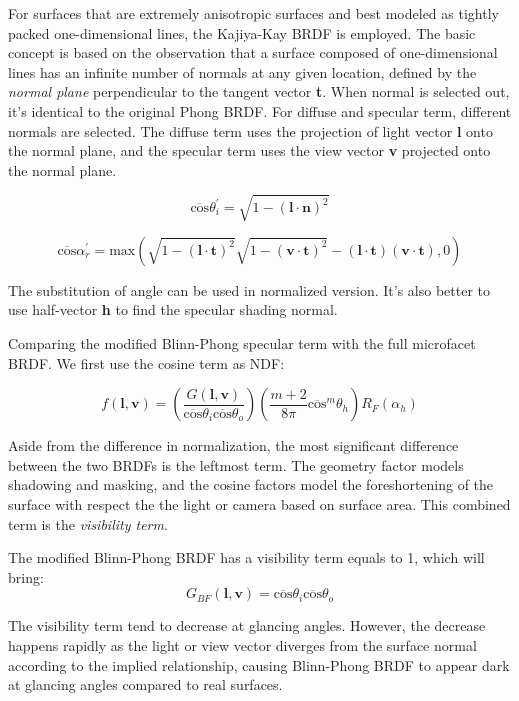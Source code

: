 \documentclass[10pt, a4paper]{article}
\begin{document}
        For surfaces that are extremely anisotropic surfaces and best modeled as tightly packed one-dimensional lines, the Kajiya-Kay BRDF is employed. The basic concept is based on the observation that a surface composed of one-dimensional lines has an infinite number of normals at any given location, defined by the \emph{normal plane} perpendicular to the tangent vector \textbf{t}. When normal is selected out, it's identical to the original Phong BRDF. For diffuse and specular term, different normals are selected. The diffuse term uses the projection of light vector \textbf{l} onto the normal plane, and the specular term uses the view vector \textbf{v} projected onto the normal plane. 

        $$\overline{\text{cos}}\theta_i^{'} = \sqrt{1 - (\textbf{l}\cdot\textbf{n})^2}$$

        $$\overline{\text{cos}}\alpha_r^{'} = \text{max}(\sqrt{1 - (\textbf{l}\cdot\textbf{t})^2}\sqrt{1 - (\textbf{v}\cdot\textbf{t})^2} - (\textbf{l}\cdot\textbf{t})(\textbf{v}\cdot\textbf{t}), 0)$$

        The substitution of angle can be used in normalized version. It's also better to use half-vector \textbf{h} to find the specular shading normal. 

        
        \bigskip 
        \bigskip


        Comparing the modified Blinn-Phong specular term with the full microfacet BRDF. We first use the cosine term as NDF:

        $$f(\textbf{l}, \textbf{v}) = (\frac{G(\textbf{l}, \textbf{v})}{\overline{\text{cos}}\theta_i\overline{\text{cos}}\theta_o})(\frac{m + 2}{8\pi}\overline{\text{cos}}^m\theta_h)R_F(\alpha_h)$$

        Aside from the difference in normalization, the most significant difference between the two BRDFs is the leftmost term. The geometry factor models shadowing and masking, and the cosine factors model the foreshortening of the surface with respect the the light or camera based on surface area. This combined term is the \emph{visibility term}.

        The modified Blinn-Phong BRDF has a visibility term equals to 1, which will bring: 
        $$G_{BF}(\textbf{l}, \textbf{v}) = \overline{\text{cos}}\theta_i\overline{\text{cos}}\theta_o$$
            
        The visibility term tend to decrease at glancing angles. However, the decrease happens rapidly as the light or view vector diverges from the surface normal according to the implied relationship, causing Blinn-Phong BRDF to appear dark at glancing angles compared to real surfaces. 
\end{document}
